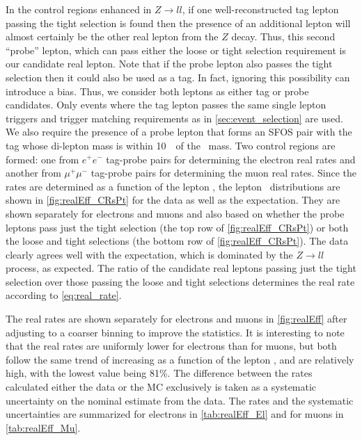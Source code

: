 In the control regions enhanced
in $Z\rightarrow ll$, if one well-reconstructed 
tag lepton passing the tight selection is found then the presence
of an additional lepton will almost certainly be the other real
lepton from the $Z$ decay. Thus, this second ``probe''
lepton, which can pass either the loose or tight selection
requirement is our candidate real lepton.
Note that if the probe lepton also passes the tight selection
then it could also be used as a tag. In fact, ignoring
this possibility can introduce a bias. Thus, we consider both 
leptons as either tag or probe candidates.
Only events where 
the tag lepton passes the same single lepton triggers and trigger
matching requirements as in \sec\ref{sec:event_selection} are used. 
We also require the presence of a 
probe lepton that forms an SFOS pair with the
tag whose di-lepton mass is within 10~\GeV~of the \z~mass.
Two control regions are formed: one from $e^{+}e^{-}$ tag-probe
pairs for determining the electron real rates and another
from $\mu^{+}\mu^{-}$ tag-probe pairs for determining the muon
real rates. 
Since the rates are determined as a function of the lepton
\pt, the lepton \pt~distributions are shown in 
\fig\ref{fig:realEff_CRsPt}
for the data as well as the expectation.
They are shown separately for electrons
and muons and also based on whether the probe leptons
pass just the tight selection 
(the top row of \fig\ref{fig:realEff_CRsPt})
or both the loose and tight selections
(the bottom row of \fig\ref{fig:realEff_CRsPt}).
The data clearly agrees well with the expectation, which is dominated
by the $Z\rightarrow ll$ process, as expected. The ratio of the 
candidate real leptons passing just the tight selection 
over those passing the loose and tight selections 
determines the real rate according to \eqn\eqref{eq:real_rate}.

The real rates are shown separately for electrons and muons 
in \fig\ref{fig:realEff} after adjusting to a coarser binning
to improve the statistics. 
It is interesting to note that the real rates
are uniformly lower for electrons than for muons, but both follow
the same trend of increasing as a function of the lepton \pt, 
and are relatively high, with the lowest value being 81\%.
The difference between the rates calculated 
either the data or the MC exclusively 
is taken as a systematic uncertainty on the nominal estimate
from the data. 
The rates and the systematic uncertainties
are summarized for electrons
in \tab\ref{tab:realEff_El} and for muons in \tab\ref{tab:realEff_Mu}.




